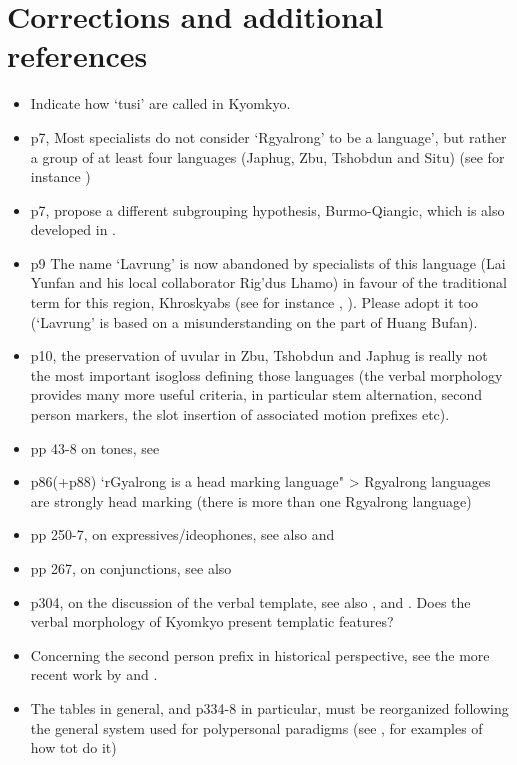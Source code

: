 \documentclass[oldfontcommands,oneside,a4paper,11pt]{article}
\begin{document}
 \section{Corrections and additional references}
\begin{itemize}
\item Indicate how `tusi' are called in Kyomkyo.
\item p7, Most specialists do not consider `Rgyalrong' to be a  language', but rather a group of at least four languages (Japhug, Zbu, Tshobdun and Situ) (see for instance \citealt[195]{jacques13harmonization})
\item p7, \citet{jacques.michaud11naish} propose a different subgrouping hypothesis, Burmo-Qiangic, which is also developed in \citet{jacques14esquisse}.
\item p9 The name `Lavrung' is now abandoned by specialists of this language (Lai Yunfan and his local collaborator Rig'dus Lhamo) in favour of the traditional term for this region, Khroskyabs (see for instance \citealt{delancey14second}, \citealt{jacques14inverse}). Please adopt it too (`Lavrung' is based on a misunderstanding on the part of Huang Bufan).
\item p10, the preservation of uvular in Zbu, Tshobdun and Japhug is really not the most important isogloss defining those languages (the verbal morphology provides many more useful criteria, in particular stem alternation, second person markers, the slot insertion of associated motion prefixes etc).
\item pp 43-8 on tones, see \citet{linyj12tone}
\item p86(+p88) `rGyalrong is a head marking language" > Rgyalrong languages are strongly head marking (there is more than one Rgyalrong language)
\item pp 250-7, on expressives/ideophones, see also \citet{japhug14ideophones} and \citet{jackson14morpho}
\item pp 267, on conjunctions, see also \citet{jacques14linking}
\item p304, on the discussion of the verbal template, see also \citet[197-199]{jacques13harmonization}, \citet[12]{jacques14antipassive} and \citet{lai13affixale}. Does the verbal morphology of Kyomkyo present templatic features?
\item Concerning the second person prefix in historical perspective, see the more recent work by \citet{jacques12agreement} and \citet{delancey14second}.
\item The tables in general, and p334-8 in particular, must be reorganized following the general system used for polypersonal paradigms (see \citet{gongxun14agreement}, \citet{jacques14inverse} for examples of how tot do it)

\end{itemize}
\end{document}
